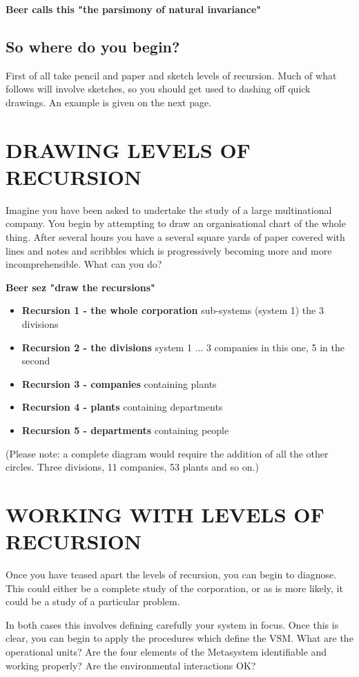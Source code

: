 \textbf{Beer calls this "the parsimony of natural invariance"}

\subsection*{So where do you begin?}
First of all take pencil and paper and sketch levels of recursion. Much of what follows will involve sketches, so you should get used to dashing off quick drawings. An example is given on the next page.

\section*{DRAWING LEVELS OF RECURSION}
Imagine you have been asked to undertake the study of a large multinational company. You begin by attempting to draw an organisational chart of the whole thing. After several hours you have a several square yards of paper covered with lines and notes and scribbles which is progressively becoming more and more incomprehensible. What can you do?

\textbf{Beer sez "draw the recursions"}

\begin{itemize}
  \item \textbf{Recursion 1 - the whole corporation} sub-systems (system 1) the 3 divisions
  \item \textbf{Recursion 2 - the divisions} system 1 ... 3 companies in this one, 5 in the second
  \item \textbf{Recursion 3 - companies} containing plants
  \item \textbf{Recursion 4 - plants} containing departments
  \item \textbf{Recursion 5 - departments} containing people
\end{itemize}

(Please note: a complete diagram would require the addition of all the other circles. Three divisions, 11 companies, 53 plants and so on.)

\section*{WORKING WITH LEVELS OF RECURSION}
Once you have teased apart the levels of recursion, you can begin to diagnose. This could either be a complete study of the corporation, or as is more likely, it could be a study of a particular problem.

In both cases this involves defining carefully your system in focus. Once this is clear, you can begin to apply the procedures which define the VSM. What are the operational units? Are the four elements of the Metasystem identifiable and working properly? Are the environmental interactions OK?


